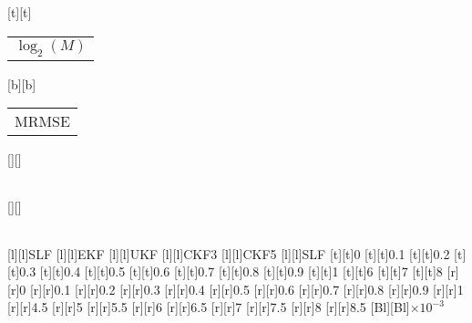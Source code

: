 %    
%
%
%
[t][t]{\color[rgb]{0,0,0}\setlength{\tabcolsep}{0pt}\begin{tabular}{c}$\log_2 (M)$\end{tabular}}%
[b][b]{\color[rgb]{0,0,0}\setlength{\tabcolsep}{0pt}\begin{tabular}{c}MRMSE\end{tabular}}%
[][]{\color[rgb]{0,0,0}\setlength{\tabcolsep}{0pt}\begin{tabular}{c} \end{tabular}}%
[][]{\color[rgb]{0,0,0}\setlength{\tabcolsep}{0pt}\begin{tabular}{c} \end{tabular}}%
[l][l]{\color[rgb]{0,0,0}SLF}%
[l][l]{\color[rgb]{0,0,0}EKF}%
[l][l]{\color[rgb]{0,0,0}UKF}%
[l][l]{\color[rgb]{0,0,0}CKF3}%
[l][l]{\color[rgb]{0,0,0}CKF5}%
[l][l]{\color[rgb]{0,0,0}SLF}%
%
[t][t]{0}%
[t][t]{0.1}%
[t][t]{0.2}%
[t][t]{0.3}%
[t][t]{0.4}%
[t][t]{0.5}%
[t][t]{0.6}%
[t][t]{0.7}%
[t][t]{0.8}%
[t][t]{0.9}%
[t][t]{1}%
[t][t]{6}%
[t][t]{7}%
[t][t]{8}%
%
[r][r]{0}%
[r][r]{0.1}%
[r][r]{0.2}%
[r][r]{0.3}%
[r][r]{0.4}%
[r][r]{0.5}%
[r][r]{0.6}%
[r][r]{0.7}%
[r][r]{0.8}%
[r][r]{0.9}%
[r][r]{1}%
[r][r]{4.5}%
[r][r]{5}%
[r][r]{5.5}%
[r][r]{6}%
[r][r]{6.5}%
[r][r]{7}%
[r][r]{7.5}%
[r][r]{8}%
[r][r]{8.5}%
[Bl][Bl]{$\times 10^{-3}$}%
%
%
